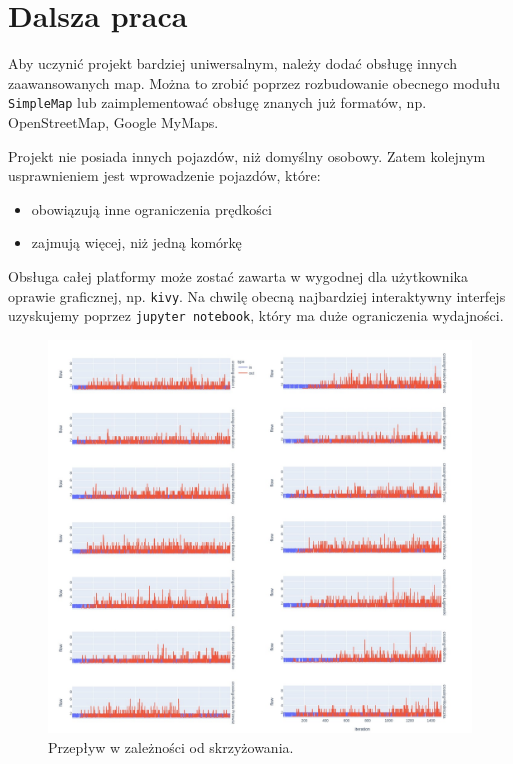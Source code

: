 \documentclass[a4paper,12pt]{article}
\begin{document}
    \section{Dalsza praca}
    Aby uczynić projekt bardziej uniwersalnym, należy dodać obsługę innych zaawansowanych map.
    Można to zrobić poprzez rozbudowanie obecnego modułu \texttt{SimpleMap} lub zaimplementować obsługę znanych już formatów, np. OpenStreetMap, Google MyMaps.
    
    Projekt nie posiada innych pojazdów, niż domyślny osobowy. Zatem kolejnym usprawnieniem jest wprowadzenie pojazdów, które: 
    \begin{itemize}
    	\item obowiązują inne ograniczenia prędkości
    	\item zajmują więcej, niż jedną komórkę
    \end{itemize}

	Obsługa całej platformy może zostać zawarta w wygodnej dla użytkownika oprawie graficznej, np. \texttt{kivy}. Na chwilę obecną najbardziej interaktywny interfejs uzyskujemy poprzez \texttt{jupyter notebook}, który ma duże ograniczenia wydajności.
	
	\begin{figure}[p]
		\centering
		\includegraphics[width=\linewidth]{img/note-inout-crossing.jpg}
		\caption{Przepływ w zależności od skrzyżowania.}
	\end{figure}
\end{document}
